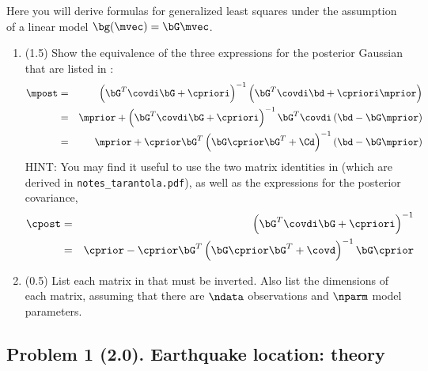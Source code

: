 \documentclass[11pt,titlepage,fleqn]{article}
\begin{document}
Here you will derive formulas for generalized least squares under the assumption of a linear model $\bg(\mvec) = \bG\mvec$.
%
\begin{enumerate}
\item (1.5) Show the equivalence of the three expressions for the posterior Gaussian that are listed in \citet[][p.~66]{Tarantola2005}:
%
\begin{eqnarray}
\mpost &=& \left(\bG^T \covdi \bG + \cpriori \right)^{-1}
\left( \bG^T \covdi \bd + \cpriori\mprior \right)
\label{mpost1}
\\
&=& \mprior + \left(\bG^T \covdi \bG + \cpriori \right)^{-1} \bG^T \covdi \left( \bd - \bG \mprior\right)
\label{mpost2}
\\
&=& \mprior + \cprior \bG^T \left( \bG \cprior \bG^T + \Cd\right)^{-1} \left( \bd - \bG \mprior\right)
\label{mpost3}
\end{eqnarray}
%
HINT: You may find it useful to use the two matrix identities in \citet[][Eq.~6.525]{Tarantola2005} (which are derived in \verb+notes_tarantola.pdf+), as well as the expressions for the posterior covariance,
%
\begin{eqnarray}
\cpost &=& \left(\bG^T \covdi \bG + \cpriori \right)^{-1}
\label{cpost1}
\\
&=& \cprior - \cprior \bG^T \left( \bG \cprior \bG^T + \covd \right)^{-1} \bG \cprior
\label{cpost2}
\end{eqnarray}

\item (0.5) List each matrix in  that must be inverted. Also list the dimensions of each matrix, assuming that there are $\ndata$ observations and $\nparm$ model parameters.
\end{enumerate}


\subsection*{Problem 1 (2.0). Earthquake location: theory}
\end{document}
